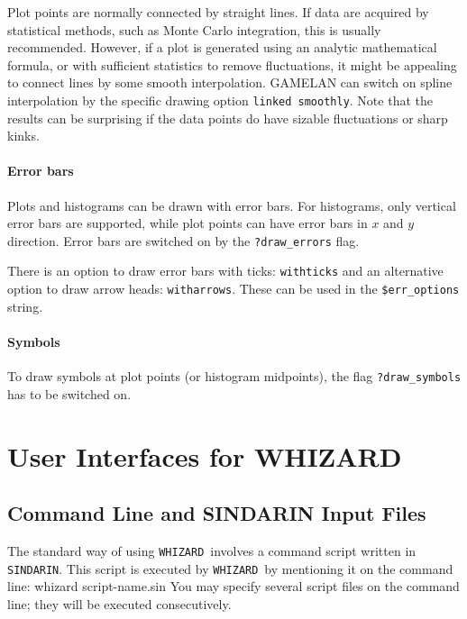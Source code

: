 \documentclass[12pt]{book}
\newenvironment{interaction}%
  {\begingroup\small
   \verbatim}%
  {\endverbatim
   \endgroup\noindent}
\newcommand{\ttt}[1]{\texttt{#1}}
\newcommand{\whizard}{\texttt{WHIZARD}}
\newcommand{\sindarin}{\texttt{SINDARIN}}
\begin{document}
Plot points are normally connected by straight lines.  If data are acquired by
statistical methods, such as Monte Carlo integration, this is usually
recommended.  However, if a plot is generated using an analytic mathematical
formula, or with sufficient statistics to remove fluctuations, it might be
appealing to connect lines by some smooth interpolation.  GAMELAN can switch
on spline interpolation by the specific drawing option \ttt{linked smoothly}.
Note that the results can be surprising if the data points do have sizable
fluctuations or sharp kinks.


\subsubsection{Error bars}

Plots and histograms can be drawn with error bars.  For histograms, only
vertical error bars are supported, while plot points can have error bars in
$x$ and $y$ direction.  Error bars are switched on by the \ttt{?draw\_errors}
flag.

There is an option to draw error bars with ticks: \ttt{withticks} and an
alternative option to draw arrow heads: \ttt{witharrows}.  These can be used
in the \ttt{\$err\_options} string.


\subsubsection{Symbols}

To draw symbols at plot points (or histogram midpoints), the flag
\ttt{?draw\_symbols} has to be switched on.





\chapter{User Interfaces for WHIZARD}

\section{Command Line and SINDARIN Input Files}
\label{sec:cmdline-options}

The standard way of using \whizard\ involves a command script written
in \sindarin.  This script is executed by \whizard\ by mentioning it
on the command line:
\begin{interaction}
  whizard script-name.sin
\end{interaction}
You may specify several script files on the command line; they will be
executed consecutively.
\end{document}
